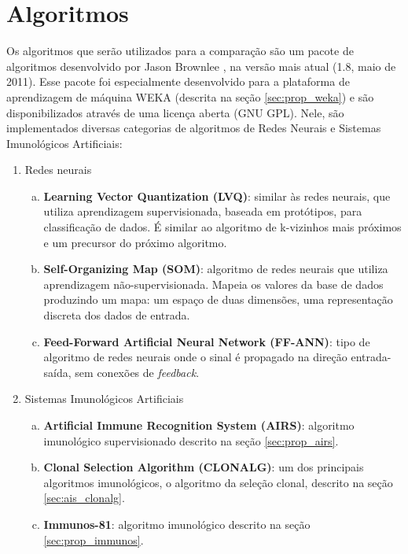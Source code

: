 \section{Algoritmos}

Os algoritmos que serão utilizados para a comparação são um pacote de algoritmos desenvolvido por Jason Brownlee \cite{Brownlee2011}, na versão mais atual (1.8, maio de 2011). Esse pacote foi especialmente desenvolvido para a plataforma de aprendizagem de máquina WEKA (descrita na seção \ref{sec:prop_weka}) e são disponibilizados através de uma licença aberta (GNU GPL). Nele, são implementados diversas categorias de algoritmos de Redes Neurais e Sistemas Imunológicos Artificiais:

\begin{enumerate}
    \item Redes neurais
    \begin{enumerate}[a)]
        \item \textbf{Learning Vector Quantization (LVQ)}: similar às redes neurais, que utiliza aprendizagem supervisionada, baseada em protótipos, para classificação de dados. É similar ao algoritmo de k-vizinhos mais próximos e um precursor do próximo algoritmo.
        \item \textbf{Self-Organizing Map (SOM)}: algoritmo de redes neurais que utiliza aprendizagem não-supervisionada. Mapeia os valores da base de dados produzindo um mapa: um espaço de duas dimensões, uma representação discreta dos dados de entrada.
        \item \textbf{Feed-Forward Artificial Neural Network (FF-ANN)}: tipo de algoritmo de redes neurais onde o sinal é propagado na direção entrada-saída, sem conexões de \emph{feedback}.
    \end{enumerate}
    \item Sistemas Imunológicos Artificiais
    \begin{enumerate}[a)]
        \item \textbf{Artificial Immune Recognition System (AIRS)}: algoritmo imunológico supervisionado descrito na seção \ref{sec:prop_airs}.
        \item \textbf{Clonal Selection Algorithm (CLONALG)}: um dos principais algoritmos imunológicos, o algoritmo da seleção clonal, descrito na seção \ref{sec:ais_clonalg}.
        \item \textbf{Immunos-81}: algoritmo imunológico descrito na seção \ref{sec:prop_immunos}.
    \end{enumerate}
\end{enumerate}

